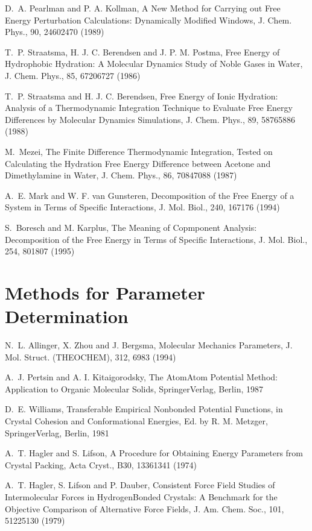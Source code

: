 \documentclass[letterpaper,11pt,english]{sphinxmanual}
\begin{document}
D. A. Pearlman and P. A. Kollman, A New Method for Carrying out Free Energy Perturbation Calculations: Dynamically Modified Windows, J. Chem. Phys., 90, 2460\sphinxhyphen{}2470 (1989)

T. P. Straatsma, H. J. C. Berendsen and J. P. M. Postma, Free Energy of Hydrophobic Hydration:  A Molecular Dynamics Study of Noble Gases in Water, J. Chem. Phys., 85, 6720\sphinxhyphen{}6727 (1986)

T. P. Straatsma and H. J. C. Berendsen, Free Energy of Ionic Hydration:  Analysis of a Thermodynamic Integration Technique to Evaluate Free Energy Differences by Molecular Dynamics Simulations, J. Chem. Phys., 89, 5876\sphinxhyphen{}5886 (1988)

M. Mezei, The Finite Difference Thermodynamic Integration, Tested on Calculating the Hydration Free Energy Difference between Acetone and Dimethylamine in Water, J. Chem. Phys., 86, 7084\sphinxhyphen{}7088 (1987)

A. E. Mark and W. F. van Gunsteren, Decomposition of the Free Energy of a System in Terms of Specific Interactions, J. Mol. Biol., 240, 167\sphinxhyphen{}176 (1994)

S. Boresch and M. Karplus, The Meaning of Copmponent Analysis: Decomposition of the Free Energy in Terms of Specific Interactions, J. Mol. Biol., 254, 801\sphinxhyphen{}807 (1995)


\section{Methods for Parameter Determination}
\label{\detokenize{text/references:methods-for-parameter-determination}}
N. L. Allinger, X. Zhou and J. Bergsma, Molecular Mechanics Parameters, J. Mol. Struct. (THEOCHEM), 312, 69\sphinxhyphen{}83 (1994)

A. J. Pertsin and A. I. Kitaigorodsky, The Atom\sphinxhyphen{}Atom Potential Method: Application to Organic Molecular Solids, Springer\sphinxhyphen{}Verlag, Berlin, 1987

D. E. Williams, Transferable Empirical Nonbonded Potential Functions, in Crystal Cohesion and Conformational Energies, Ed. by R. M. Metzger, Springer\sphinxhyphen{}Verlag, Berlin, 1981

A. T. Hagler and S. Lifson, A Procedure for Obtaining Energy Parameters from Crystal Packing, Acta Cryst., B30, 1336\sphinxhyphen{}1341 (1974)

A. T. Hagler, S. Lifson and P. Dauber, Consistent Force Field Studies of Intermolecular Forces in Hydrogen\sphinxhyphen{}Bonded Crystals:  A Benchmark for the Objective Comparison of Alternative Force Fields, J. Am. Chem. Soc., 101, 5122\sphinxhyphen{}5130 (1979)
\end{document}
